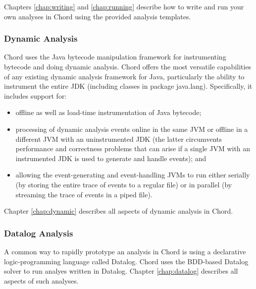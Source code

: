 Chapters \ref{chap:writing} and \ref{chap:running} describe how to write and run
your own analyses in Chord using the provided analysis templates.

\subsubsection*{Dynamic Analysis}

Chord uses the  Java bytecode
manipulation framework for instrumenting bytecode and doing dynamic analysis.
Chord offers the most versatile capabilities of any existing dynamic analysis
framework for Java, particularly the ability to instrument the entire JDK
(including classes in package java.lang).  Specifically, it includes support
for:

\begin{itemize}
\item
offline as well as load-time instrumentation of Java bytecode;
\item
processing of dynamic analysis events online in the same JVM or offline in a
different JVM with an uninstrumented JDK (the latter circumvents performance and
correctness problems that can arise if a single JVM with an instrumented JDK is
used to generate and handle events); and
\item
allowing the event-generating and event-handling JVMs to run either serially
(by storing the entire trace of events to a regular file) or in parallel (by
streaming the trace of events in a piped file).
\end{itemize}

Chapter \ref{chap:dynamic} describes all aspects of dynamic analysis in Chord.

\subsubsection*{Datalog Analysis}

A common way to rapidly prototype an analysis in Chord is using a declarative
logic-programming language called Datalog.  Chord uses the BDD-based Datalog
solver  to run analyes written
in Datalog.  Chapter \ref{chap:datalog} describes all aspects of such analyses.

